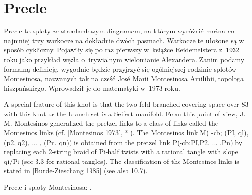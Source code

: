 \section{Precle} %
Precle to sploty ze standardowym diagramem, na którym wyróżnić można co najmniej trzy warkocze na dokładnie dwóch pasmach.
Warkocze te ułożone są w sposób cykliczny.
Pojawiły się po raz pierwszy w~książce Reidemeistera z~1932 roku jako przykład węzła o~trywialnym wielomianie Alexandera.
Zanim podamy formalną definicję, wygodnie będzie przyjrzyć się ogólniejszej rodzinie splotów Montesinosa, nazwanych tak na cześć José Marii Montesinosa Amilibii, topologa hiszpańskiego.
Wprowadził je do matematyki w~1973 roku.

\begin{tobedone}
A special feature of this knot is that the two-fold branched covering space over 83 with this knot as the branch set is a Seifert manifold. From this point of view, J. M. Montesinos generalized the pretzel links to a class of links called the Montesinos links (cf. [Montesinos 1973', *]). The Montesinos link M( -cb; (PI, ql), (p2, q2), ... , (Pn, qn)) is obtained from the pretzel link P(-cb;PI,P2, ... ,Pn) by replacing each 2-string braid of Pi-half twists with a rational tangle with slope qi/Pi (see 3.3 for rational tangles). The classification of the Montesinos links is stated in [Burde-Zieschang 1985] (see also 10.7).
\end{tobedone}

\begin{tobedone}
    Precle i sploty Montesinosa: \cite[s. 27]{kawauchi96}.
\end{tobedone}


